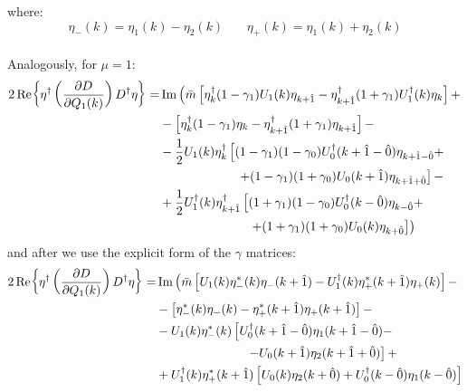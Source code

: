where:
\begin{equation*}
    \eta_-(k) = \eta_1 (k) - \eta_2(k) \,\,\,\,\,\,\,\,\,\,\, \eta_+(k) = \eta_1 (k) + \eta_2 (k)
\end{equation*}
\\ Analogously, for $\mu = 1$:
\begin{equation}
    \begin{split}
                2 \Re{\eta^\dagger \left( \pdv{D}{Q_1(k)} \right) D^\dagger \eta} = & \Im \left(\Bar{m} \left[ \eta^\dagger_k (1 - \gamma_1) U_1 (k) \eta_{k + \hat{1}} - \eta^\dagger_{k + \hat{1}} (1 + \gamma_1) U_1^\dagger(k)\eta_k \right] + \right. \\
         & -  \left[ \eta^\dagger_k (1 - \gamma_1) \eta_k - \eta^\dagger_{k + \hat{1}} (1 + \gamma_1) \eta_{k + \hat{1}} \right] - \\
        & - \frac{1}{2} U_1(k) \eta_k^\dagger \left[ (1-\gamma_1)(1 - \gamma_0) U_0^\dagger(k + \hat{1} - \hat{0}) \eta_{k + \hat{1} -\hat{0}} + \right.  \\ 
        & \,\,\,\,\,\,\,\,\,\,\,\,\,\,\,\,\,\,\,\,\,\,\,\,\,\,\,\,\,\,\,\,\,\,\,\,\, \left. + (1 - \gamma_1)(1 + \gamma_0) U_0 (k + \hat{1}) \eta_{k + \hat{1} + \hat{0}} \right] - \\
        & + \frac{1}{2} U_1^\dagger(k) \eta_{k + \hat{1}}^\dagger \left[(1+\gamma_1)(1 - \gamma_0) U_0^\dagger(k-\hat{0}) \eta_{k - \hat{0}} +  \right. \\
        & \,\,\,\,\,\,\,\,\,\,\,\,\,\,\,\,\,\,\,\,\,\,\,\,\,\,\,\,\,\,\,\,\,\,\,\,\,\,\,\,\,\, \left. \left. + (1 + \gamma_1)(1 + \gamma_0) U_0 (k) \eta_{k + \hat{0}} \right]\right)
    \end{split}
\end{equation}
and after we use the explicit form of the $\gamma$ matrices:
\begin{equation}
    \begin{split}
         2 \Re{\eta^\dagger \left( \pdv{D}{Q_1(k)} \right) D^\dagger \eta} = & \Im \left( \Bar{m} \left[U_1 (k) \eta_-^*(k)  \eta_-(k + \hat{1}) - U_1^\dagger(k) \eta_+^*(k + \hat{1}) \eta_+(k) \right] - \right. \\
         & -  \left[ \eta_-^*(k) \eta_-(k) - \eta_+^*(k + \hat{1}) \eta_+ (k + \hat{1}) \right] - \\
        & - U_1(k) \eta_-^*(k) \left[ U_0^\dagger ( k + \hat{1} - \hat{0} ) \eta_1 (k + \hat{1} - \hat{0}) - \right.  \\ 
        & \,\,\,\,\,\,\,\,\,\,\,\,\,\,\,\,\,\,\,\,\,\,\,\,\,\,\,\,\,\,\,\,\,\,\,\,\,\,\,\,\,\,\,\, \left. - U_0(k + \hat{1}) \eta_2 (k + \hat{1} + \hat{0}) \right] + \\
        & + U_1^\dagger(k) \eta_{+}^*(k + \hat{1}) \left[ U_0(k) \eta_2 (k + \hat{0}) + U_0^\dagger(k - \hat{0}) \eta_{1}(k - \hat{0})  \right]
    \end{split}
\end{equation}
